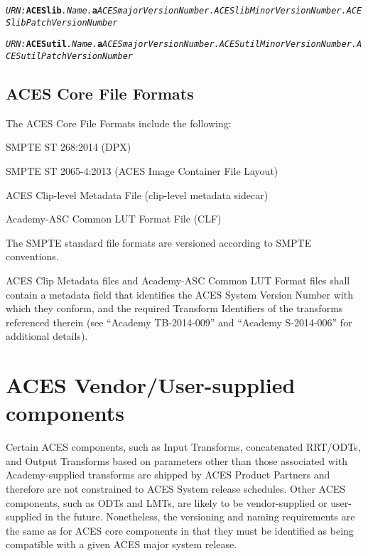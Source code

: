 \begin{sloppypar}
\texttt{\textit{URN:}\textbf{ACESlib}\textit{.Name.\+}\textbf{a}\textit{ACESmajorVersionNumber.ACESlibMinorVersionNumber.ACESlib\+Patch\+Version\+Number}}
\end{sloppypar}

\begin{sloppypar}
\texttt{\textit{URN:}\textbf{ACESutil}\textit{.Name.\+}\textbf{a}\textit{ACESmajorVersionNumber.ACESutilMinorVersionNumber.ACES\+utilPatchVersionNumber}}
\end{sloppypar}


\subsection{ACES Core File Formats}
The ACES Core File Formats include the following:

\begin{listize}[-]
	\item SMPTE ST 268:2014 (DPX)
	\item SMPTE ST 2065-4:2013 (ACES Image Container File Layout)
	\item ACES Clip-level Metadata File (clip-level metadata sidecar)
	\item Academy-ASC Common LUT Format File (CLF)
\end{listize}

The SMPTE standard file formats are versioned according to SMPTE conventions.

ACES Clip Metadata files and Academy-ASC Common LUT Format files shall contain a metadata field that identifies the ACES System Version Number with which they conform, and the required Transform Identifiers of the transforms referenced therein (see ``Academy TB-2014-009'' and ``Academy S-2014-006'' for additional details).

\section{ACES Vendor/User-supplied components}
Certain ACES components, such as Input Transforms, concatenated RRT/ODTs, and Output Transforms based on parameters other than those associated with Academy-supplied transforms are shipped by ACES Product Partners and therefore are not constrained to ACES System release schedules. Other ACES components, such as ODTs and LMTs, are likely to be vendor-supplied or user-supplied in the future. Nonetheless, the versioning and naming requirements are the same as for ACES core components in that they must be identified as being compatible with a given ACES major system release.

